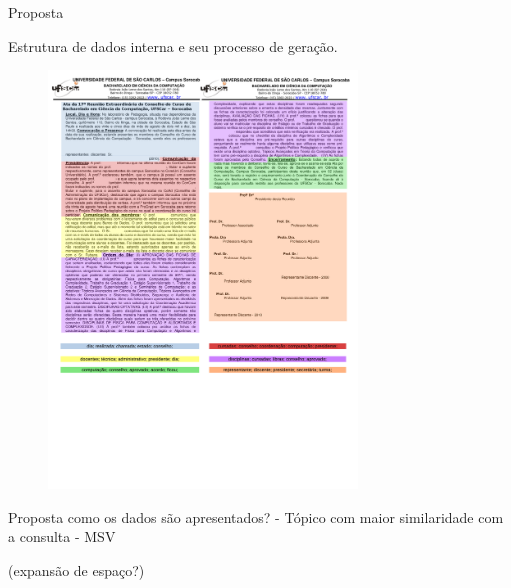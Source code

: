 \documentclass[xcolor=dvipsnames]{beamer}
\begin{document}
\begin{frame}{Proposta}

	\center Estrutura de dados interna e seu processo de geração.

	\begin{figure}[h!]

		\includegraphics[trim={ 0 235 0 16 },clip,page=1,width=0.73\textwidth]{images/distribuicao.pdf}

	\end{figure}

\end{frame}

 
\begin{frame}{Proposta}
como os dados são apresentados?
- Tópico com maior similaridade com a consulta
	- MSV 

	(expansão de espaço?)

\end{frame}

 
 
\end{document}
